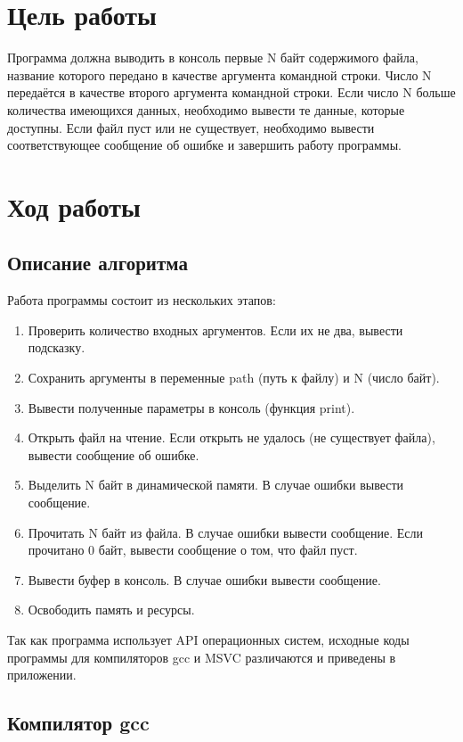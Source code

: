 \section{Цель работы}
Программа должна выводить в консоль первые N байт содержимого файла, название которого передано в качестве аргумента командной строки. Число N передаётся в качестве второго аргумента командной строки. Если число N больше количества имеющихся данных, необходимо вывести те данные, которые доступны. Если файл пуст или не существует, необходимо вывести соответствующее сообщение об ошибке и завершить работу программы. 


\section{Ход работы}

\subsection{Описание алгоритма}

Работа программы состоит из нескольких этапов:
\begin{enumerate}
    \item Проверить количество входных аргументов. Если их не два, вывести подсказку.
    \item Сохранить аргументы в переменные path (путь к файлу) и N (число байт).
    \item Вывести полученные параметры в консоль (функция print).
    \item Открыть файл на чтение. Если открыть не удалось (не существует файла), вывести сообщение об ошибке.
    \item Выделить N байт в динамической памяти. В случае ошибки вывести сообщение.
    \item Прочитать N байт из файла. В случае ошибки вывести сообщение. Если прочитано 0 байт, вывести сообщение о том, что файл пуст.
    \item Вывести буфер в консоль. В случае ошибки вывести сообщение.
    \item Освободить память и ресурсы.
\end{enumerate}

Так как программа использует API операционных систем, исходные коды программы для компиляторов gcc и MSVC различаются и приведены в приложении.

\subsection{Компилятор gcc}

